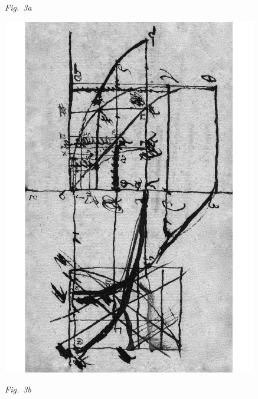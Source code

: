   \centerline{\lbrack\textit{Fig.~3a}\rbrack}%
  \label{LH_35_09_15_013v_Fig.3}%
  \newpage%
%
%
  \centerline{\includegraphics[width=0.835\textwidth]{gesamttex/edit_VIII,3/images/LH_35_09_15_012-013_d3b.pdf}}%
  \vspace{0.5em}
  \centerline{\lbrack\textit{Fig.~3b}\rbrack}%
  \label{LH_35_09_15_013v_Fig.3_fs}
%
%
%
\newpage%
%